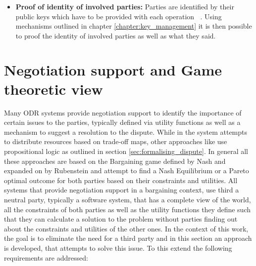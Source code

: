 \documentclass[12pt,msc,a4paper,oneside]{ucl_thesis}
\DeclareMathOperator{\metaop}{\mathcal{o}_m}
\begin{document}
\begin{itemize}
    \item{\textbf{Proof of identity of involved parties:}} Parties are identified by their public keys which have to be provided with each operation $\metaop$. Using mechanisms outlined in chapter \ref{chapter:key_management} it is then possible to proof the identity of involved parties as well as what they said.

\end{itemize}


\section{Negotiation support and Game theoretic view} \label{sec:negotiation_support}
Many ODR systems provide negotiation support to identify the importance of certain issues to the parties, typically defined via utility functions as well as a mechanism to suggest a resolution to the dispute. While in \cite{Bellucci:2004:IAI:1032651.1033678} the system attempts to distribute resources based on trade-off maps, other approaches like \cite{Ragone:2006:PAO:1124566.1124569} use propositional logic as outlined in section \ref{sec:formalising_dispute}. In general all these approaches are based on the Bargaining game defined by Nash \cite{Nash:bargaining} and expanded on by Rubenstein \cite{Rubenstein} and attempt to find a Nash Equilibrium or a Pareto optimal outcome for both parties based on their constraints and utilities. All systems that provide negotiation support in a bargaining context, use third a neutral party, typically a software system, that has a complete view of the world, all the constraints of both parties as well as the utility functions they define such that they can calculate a solution to the problem without parties finding out about the constraints and utilities of the other ones. In the context of this work, the goal is to eliminate the need for a third party and in this section an approach is developed, that attempts to solve this issue. To this extend the following requirements are addressed:
\end{document}
